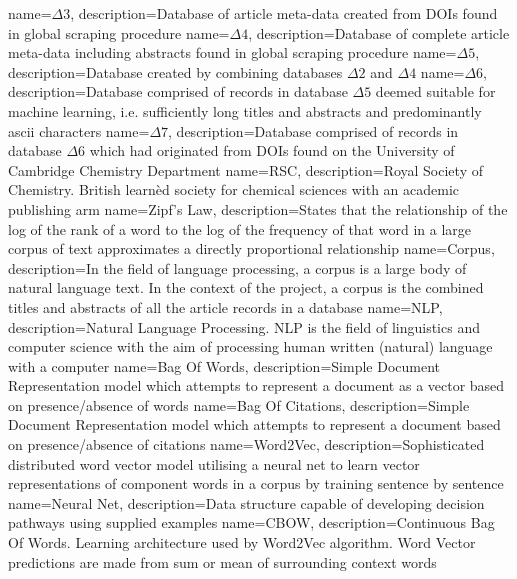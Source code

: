 {
name={$\Delta3$},
description={Database of article meta-data created from DOIs found in global scraping procedure} 
} 
{
name={$\Delta4$},
description={Database of complete article meta-data including abstracts found in global scraping procedure} 
}
{
name={$\Delta5$},
description={Database created by combining databases $\Delta2$ and $\Delta4$} 
}
{
name={$\Delta6$},
description={Database comprised of records in database $\Delta5$ deemed suitable for machine learning, i.e.  sufficiently long titles and abstracts and predominantly ascii characters} 
}
{
name={$\Delta7$},
description={Database comprised of records in database $\Delta6$ which had originated from DOIs found on the University of Cambridge Chemistry Department} 
}
{
name={RSC},
description={Royal Society of Chemistry. British learn\`ed society for chemical sciences with an academic publishing arm} 
}
{
name={Zipf's Law},
description={States that the relationship of the log of the rank of a word to the log of the frequency of that word in a large corpus of text approximates a directly proportional relationship \cite{zipf}} 
}
{
name={Corpus},
description={In the field of language processing, a corpus is a large body of natural language text. In the context of the project, a corpus is the combined titles and abstracts of all the article records in a database} 
}
{
name={NLP},
description={Natural Language Processing. NLP is the field of linguistics and computer science with the aim of processing human written (natural) language with a computer} 
}
{
name={Bag Of Words},
description={Simple Document Representation model which attempts to represent a document as a vector based on presence/absence of words} 
}
{
name={Bag Of Citations},
description={Simple Document Representation model which attempts to represent a document based on presence/absence of citations} 
}
{
name={Word2Vec},
description={Sophisticated distributed word vector model utilising a neural net to learn vector representations of  component words in a corpus by training sentence by sentence \cite{word2vec1}\cite{word2vec2}  } 
}
{
name={Neural Net},
description={Data structure capable of developing decision pathways using supplied examples} 
}
{
name={CBOW},
description={Continuous Bag Of Words. Learning architecture used by Word2Vec algorithm. Word Vector predictions are made from sum or mean of surrounding context words} 
}
